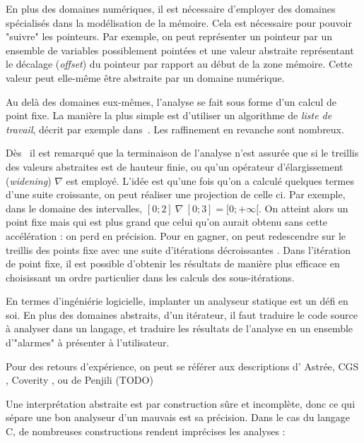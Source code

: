 En plus des domaines numériques, il est nécessaire d'employer des domaines
spécialisés dans la modélisation de la mémoire. Cela est nécessaire pour pouvoir
"suivre" les pointeurs. Par exemple, on peut représenter un pointeur par un
ensemble de variables possiblement pointées et une valeur abstraite représentant
le décalage (\emph{offset}) du pointeur par rapport au début de la zone mémoire.
Cette valeur peut elle-même être abstraite par un domaine numérique.

Au delà des domaines eux-mêmes, l'analyse se fait sous forme d'un calcul de
point fixe. La manière la plus simple est d'utiliser un algorithme de
\emph{liste de travail}, décrit par exemple dans~\cite{tapsoft95}. Les
raffinement en revanche sont nombreux.

Dès~\cite{Cousot77} il est remarqué que la terminaison de l'analyse n'est
assurée que si le treillis des valeurs abstraites est de hauteur finie, ou qu'un
opérateur d'élargissement (\emph{widening}) $\nabla$ est employé. L'idée est
qu'une fois qu'on a calculé quelques termes d'une suite croissante, on peut
réaliser une projection de celle ci. Par exemple, dans le domaine des
intervalles, $[0;2]~\nabla~[0;3] = [0;+\infty[$. On atteint alors un point fixe
mais qui est plus grand que celui qu'on aurait obtenu sans cette accélération :
on perd en précision. Pour en gagner, on peut redescendre sur le treillis des
points fixe avec une suite d'itérations décroissantes \cite{granger}. Dans
l'itération de point fixe, il est possible d'obtenir les résultats de manière
plus efficace en choisissant un ordre particulier dans les calculs des
sous-itérations\cite{policy}.


En termes d'ingéniérie logicielle, implanter un analyseur statique est un défi
en soi. En plus des domaines abstraits, d'un itérateur, il faut traduire le code
source à analyser dans un langage, et traduire les résultats de l'analyse en un
ensemble d'"alarmes" à présenter à l'utilisateur.

Pour des retours d'expérience, on peut se référer aux descriptions d'
Astrée\cite{Astree04,Astree05,AstreeScale},
CGS \cite{cgs},
Coverity \cite{coverityBillion},
ou de Penjili (TODO)


Une interprétation abstraite est par construction sûre et incomplète, donc ce
qui sépare une bon analyseur d'un mauvais est sa précision. Dans le cas du
langage C, de nombreuses constructions rendent imprécises les analyses :

